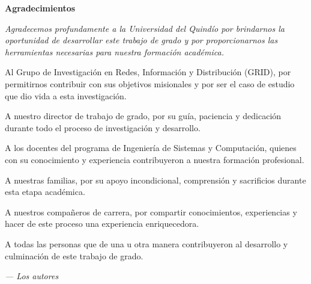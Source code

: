 \cleardoublepage
{}
\thispagestyle{empty}

\vspace*{\fill} %

\begin{center}
{\Large\bfseries Agradecimientos}
\end{center}

\vspace{2cm}

{\centering
{\itshape
Agradecemos profundamente a la Universidad del Quindío por brindarnos la oportunidad de desarrollar este trabajo de grado y por proporcionarnos las herramientas necesarias para nuestra formación académica.

Al Grupo de Investigación en Redes, Información y Distribución (GRID), por permitirnos contribuir con sus objetivos misionales y por ser el caso de estudio que dio vida a esta investigación.

A nuestro director de trabajo de grado, por su guía, paciencia y dedicación durante todo el proceso de investigación y desarrollo.

A los docentes del programa de Ingeniería de Sistemas y Computación, quienes con su conocimiento y experiencia contribuyeron a nuestra formación profesional.

A nuestras familias, por su apoyo incondicional, comprensión y sacrificios durante esta etapa académica.

A nuestros compañeros de carrera, por compartir conocimientos, experiencias y hacer de este proceso una experiencia enriquecedora.

A todas las personas que de una u otra manera contribuyeron al desarrollo y culminación de este trabajo de grado.
}

\vspace{2cm}

\hfill \textit{--- Los autores}

}

\vspace*{\fill} %